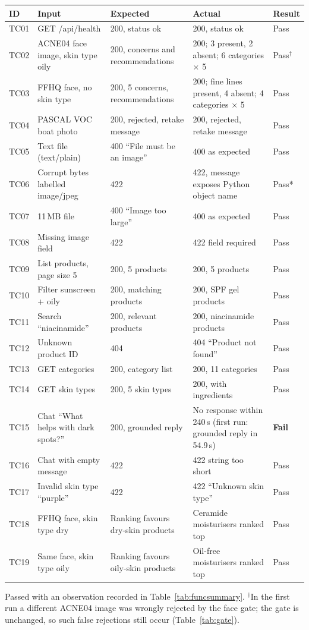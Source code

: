 {\small
\begin{longtable}{P{0.9cm}P{3.8cm}P{3.3cm}P{3.4cm}P{1.2cm}}
\toprule
\textbf{ID} & \textbf{Input} & \textbf{Expected} & \textbf{Actual} & \textbf{Result}\\
\midrule\endhead
TC01 & GET /api/health & 200, status ok & 200, status ok & Pass\\
TC02 & ACNE04 face image, skin type oily & 200, concerns and recommendations & 200; 3 present, 2 absent; 6 categories $\times$ 5 & Pass$^\dagger$\\
TC03 & FFHQ face, no skin type & 200, 5 concerns, recommendations & 200; fine lines present, 4 absent; 4 categories $\times$ 5 & Pass\\
TC04 & PASCAL VOC boat photo & 200, rejected, retake message & 200, rejected, retake message & Pass\\
TC05 & Text file (text/plain) & 400 ``File must be an image'' & 400 as expected & Pass\\
TC06 & Corrupt bytes labelled image/jpeg & 422 & 422, message exposes Python object name & Pass*\\
TC07 & 11\,MB file & 400 ``Image too large'' & 400 as expected & Pass\\
TC08 & Missing image field & 422 & 422 field required & Pass\\
TC09 & List products, page size 5 & 200, 5 products & 200, 5 products & Pass\\
TC10 & Filter sunscreen + oily & 200, matching products & 200, SPF gel products & Pass\\
TC11 & Search ``niacinamide'' & 200, relevant products & 200, niacinamide products & Pass\\
TC12 & Unknown product ID & 404 & 404 ``Product not found'' & Pass\\
TC13 & GET categories & 200, category list & 200, 11 categories & Pass\\
TC14 & GET skin types & 200, 5 skin types & 200, with ingredients & Pass\\
TC15 & Chat ``What helps with dark spots?'' & 200, grounded reply & No response within 240\,s (first run: grounded reply in 54.9\,s) & \textbf{Fail}\\
TC16 & Chat with empty message & 422 & 422 string too short & Pass\\
TC17 & Invalid skin type ``purple'' & 422 & 422 ``Unknown skin type'' & Pass\\
TC18 & FFHQ face, skin type dry & Ranking favours dry-skin products & Ceramide moisturisers ranked top & Pass\\
TC19 & Same face, skin type oily & Ranking favours oily-skin products & Oil-free moisturisers ranked top & Pass\\
\bottomrule
\end{longtable}
}
{\footnotesize *Passed with an observation recorded in Table~\ref{tab:funcsummary}. $^\dagger$In the first run a different ACNE04 image was wrongly rejected by the face gate; the gate is unchanged, so such false rejections still occur (Table~\ref{tab:gate}).}

